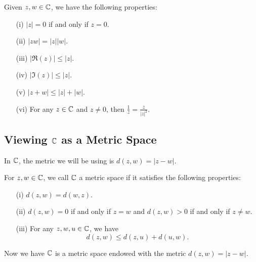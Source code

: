 \documentclass[a4paper]{report}
\begin{document}
\begin{prop}
   Given \( z,w \in \mathbb{C}  \), we have the following properties:
   \begin{enumerate}
       \item[(i)] \( | z  |  = 0  \) if and only if \( z = 0  \).
        \item[(ii)] \( | zw  |  = | z  | | w |  \).
        \item[(iii)] \( | \Re(z) |  \leq | z  |  \).
        \item[(iv)] \( | \Im(z) | \leq | z |  \).
        \item[(v)] \( | z + w  | \leq | z  |  + | w |  \).
        \item[(vi)] For any \( z \in \mathbb{C}  \) and \( z \neq 0  \), then
            \(  \frac{ 1 }{ z }  = \frac{ \overline{z} }{ | z |^{2} }. \)
   \end{enumerate}
\end{prop}

\subsection{Viewing \( \mathbb{C}  \) as a Metric Space}

In \( \mathbb{C}  \), the metric we will be using is \( d(z,w) =  | z - w  |  \).

\begin{definition}
   For \( z,w \in \mathbb{C}  \), we call \( \mathbb{C}  \) a metric space if it satisfies the following properties: 
   \begin{enumerate}
       \item[(i)] \( d(z,w) = d(w,z) \).
        \item[(ii)] \( d(z,w) = 0  \) if and only if \( z = w  \) and \( d(z,w) > 0  \) if and only if \( z \neq w  \).
        \item[(iii)] For any \( z,w,u \in \mathbb{C}  \), we have 
            \[  d(z,w) \leq d(z,u) + d(u,w). \]
   \end{enumerate}
\end{definition}

Now we have \( \mathbb{C}  \) is a metric space endowed with the metric \( d(z,w) = | z - w  |  \).
\end{document}
